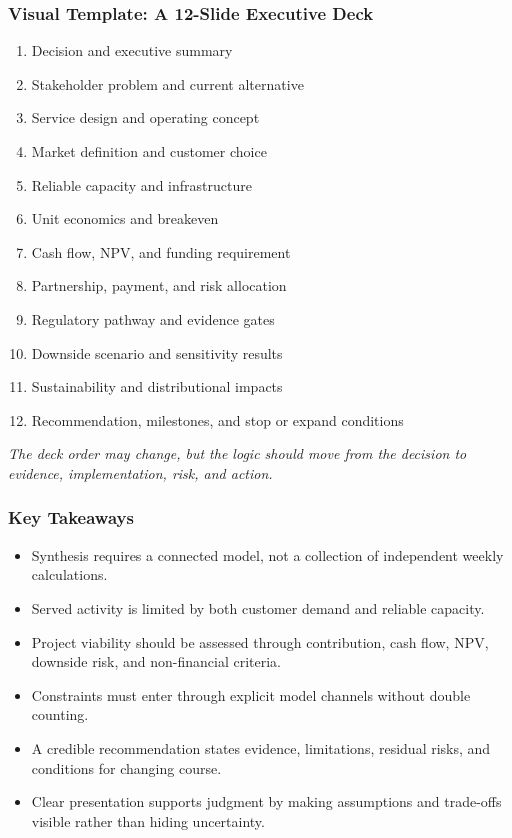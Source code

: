 \documentclass{beamer}
\begin{document}
\begin{frame}[t,shrink=10]
\frametitle{Visual Template: A 12-Slide Executive Deck}
\begin{enumerate}
\item Decision and executive summary
\item Stakeholder problem and current alternative
\item Service design and operating concept
\item Market definition and customer choice
\item Reliable capacity and infrastructure
\item Unit economics and breakeven
\item Cash flow, NPV, and funding requirement
\item Partnership, payment, and risk allocation
\item Regulatory pathway and evidence gates
\item Downside scenario and sensitivity results
\item Sustainability and distributional impacts
\item Recommendation, milestones, and stop or expand conditions
\end{enumerate}
\textit{The deck order may change, but the logic should move from the decision to evidence, implementation, risk, and action.}
\end{frame}

\begin{frame}[t]
\frametitle{Key Takeaways}
\begin{itemize}
\item Synthesis requires a connected model, not a collection of independent weekly calculations.
\item Served activity is limited by both customer demand and reliable capacity.
\item Project viability should be assessed through contribution, cash flow, NPV, downside risk, and non-financial criteria.
\item Constraints must enter through explicit model channels without double counting.
\item A credible recommendation states evidence, limitations, residual risks, and conditions for changing course.
\item Clear presentation supports judgment by making assumptions and trade-offs visible rather than hiding uncertainty.
\end{itemize}
\end{frame}
\end{document}
